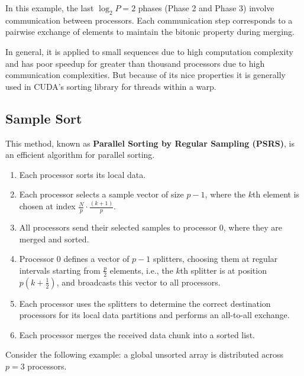 \documentclass[12pt]{book}
\begin{document}
In this example, the last $\log_2 P = 2$ phases (Phase 2 and Phase 3) involve communication between processors. Each communication step corresponds to a pairwise exchange of elements to maintain the bitonic property during merging.

In general, it is applied to small sequences due to high computation complexity and has poor speedup for greater than thousand processors due to high communication complexities. But because of its nice properties it is generally used in CUDA's sorting library for threads within a warp.

\subsection{Sample Sort}
This method, known as \textbf{Parallel Sorting by Regular Sampling (PSRS)}, is an efficient algorithm for parallel sorting.

\begin{enumerate}
    \item Each processor sorts its local data.
    \item Each processor selects a sample vector of size $p-1$, where the $k$th element is chosen at index $\frac{N}{p} \cdot \frac{(k+1)}{p}$.
    \item All processors send their selected samples to processor $0$, where they are merged and sorted.
    \item Processor $0$ defines a vector of $p-1$ splitters, choosing them at regular intervals starting from $\frac{p}{2}$ elements, i.e., the $k$th splitter is at position $p\left(k+\frac{1}{2}\right)$, and broadcasts this vector to all processors.
    \item Each processor uses the splitters to determine the correct destination processors for its local data partitions and performs an all-to-all exchange.
    \item Each processor merges the received data chunk into a sorted list.
\end{enumerate}

Consider the following example: a global unsorted array is distributed across $p=3$ processors.
\end{document}
